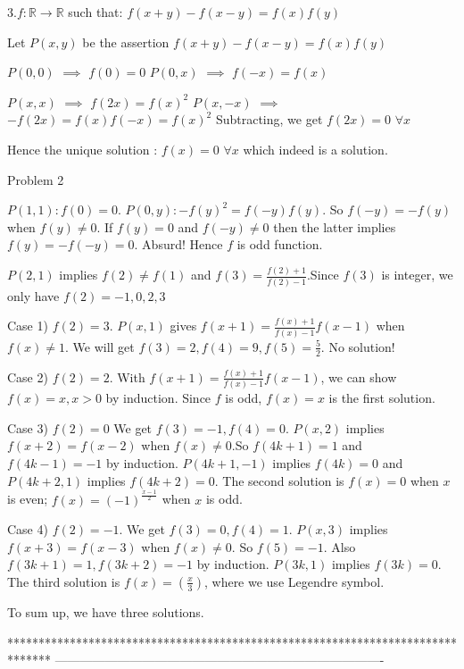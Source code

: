 \begin{solution}
	\begin{tcolorbox}3.$f:\mathbb{R}\rightarrow \mathbb{R}$ such that:
$f(x+y)-f(x-y)=f(x)f(y)$\end{tcolorbox}
Let $P(x,y)$ be the assertion $f(x+y)-f(x-y)=f(x)f(y)$

$P(0,0)$ $\implies$ $f(0)=0$
$P(0,x)$ $\implies$ $f(-x)=f(x)$

$P(x,x)$ $\implies$ $f(2x)=f(x)^2$
$P(x,-x)$ $\implies$ $-f(2x)=f(x)f(-x)=f(x)^2$
Subtracting, we get $f(2x)=0$ $\forall x$

Hence the unique solution : $\boxed{f(x)=0}$ $\forall x$ which indeed is a solution.
\end{solution}



\begin{solution}
	Problem 2

$P(1,1):f(0)=0$. $P(0,y):-f(y)^2=f(-y)f(y)$. So $f(-y)=-f(y)$ when $f(y)\neq0$. If $f(y)=0$ and $f(-y)\neq0$ then the latter implies $f(y)=-f(-y)=0$. Absurd!
Hence $f$ is odd function.

$P(2,1)$ implies $f(2)\neq f(1)$ and $f(3)=\frac{f(2)+1}{f(2)-1}$.Since $f(3)$ is integer, we only have $f(2)=-1,0,2,3$

Case 1) $f(2)=3$.
$P(x,1)$ gives $f(x+1)=\frac{f(x)+1}{f(x)-1}f(x-1)$ when $f(x)\neq 1$. We will get $f(3)=2,f(4)=9,f(5)=\frac52$. No solution!

Case 2) $f(2)=2$.
With $f(x+1)=\frac{f(x)+1}{f(x)-1}f(x-1)$, we can show $f(x)=x,x>0$ by induction. Since $f$ is odd, $f(x)=x$ is the first solution.

Case 3) $f(2)=0$
We get $f(3)=-1,f(4)=0$. $P(x,2)$ implies $f(x+2)=f(x-2)$ when $f(x)\neq0$.So $f(4k+1)=1$ and $f(4k-1)=-1$ by induction. 
$P(4k+1,-1)$ implies $f(4k)=0$ and $P(4k+2,1)$ implies $f(4k+2)=0$. 
The second solution is $f(x)=0$ when $x$ is even; $f(x)=(-1)^{\frac {x-1}2}$ when $x$ is odd.

Case 4) $f(2)=-1$.
We get $f(3)=0,f(4)=1$. $P(x,3)$ implies $f(x+3)=f(x-3)$ when $f(x)\neq0$. So $f(5)=-1$. Also $f(3k+1)=1,f(3k+2)=-1$ by induction. $P(3k,1)$ implies $f(3k)=0$.
The third solution is $f(x)=\left(\frac x3\right)$, where we use Legendre symbol.

To sum up, we have three solutions.
\end{solution}
*******************************************************************************
-------------------------------------------------------------------------------


